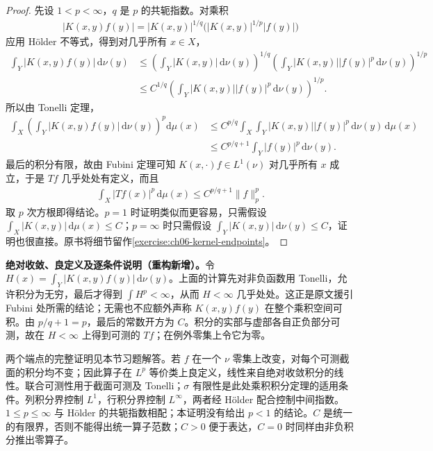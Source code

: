 \documentclass[../../main.tex]{subfiles}
\begin{document}
\begin{proof}
先设 $1<p<\infty$，$q$ 是 $p$ 的共轭指数。对乘积
\begin{align*}
|K(x,y)f(y)|=|K(x,y)|^{1/q}\bigl(|K(x,y)|^{1/p}|f(y)|\bigr)
\end{align*}
应用 Hölder 不等式，得到对几乎所有 $x\in X$，
\begin{align*}
\int_Y|K(x,y)f(y)|\,\mathrm d\nu(y)
&\leqslant\left(\int_Y|K(x,y)|\,\mathrm d\nu(y)\right)^{1/q}
\left(\int_Y|K(x,y)||f(y)|^p\,\mathrm d\nu(y)\right)^{1/p}\\
&\leqslant C^{1/q}\left(\int_Y|K(x,y)||f(y)|^p\,\mathrm d\nu(y)\right)^{1/p}.
\end{align*}
所以由 Tonelli 定理，
\begin{align*}
\int_X\left(\int_Y|K(x,y)f(y)|\,\mathrm d\nu(y)\right)^p\mathrm d\mu(x)
&\leqslant C^{p/q}\int_X\int_Y|K(x,y)||f(y)|^p\,\mathrm d\nu(y)\,\mathrm d\mu(x)\\
&\leqslant C^{p/q+1}\int_Y|f(y)|^p\,\mathrm d\nu(y).
\end{align*}
最后的积分有限，故由 Fubini 定理可知 $K(x,\cdot)f\in L^1(\nu)$ 对几乎所有 $x$ 成立，于是 $Tf$ 几乎处处有定义，而且
\begin{align*}
\int_X|Tf(x)|^p\,\mathrm d\mu(x)\leqslant C^{p/q+1}\|f\|_p^p.
\end{align*}
取 $p$ 次方根即得结论。$p=1$ 时证明类似而更容易，只需假设 $\int_X|K(x,y)|\,\mathrm d\mu(x)\leqslant C$；$p=\infty$ 时只需假设 $\int_Y|K(x,y)|\,\mathrm d\nu(y)\leqslant C$，证明也很直接。原书将细节留作\cref{exercise:ch06-kernel-endpoints}。
\end{proof}
\begin{remark}
\textbf{绝对收敛、良定义及逐条件说明（重构新增）。}令 $H(x)=\int_Y|K(x,y)f(y)|\,\mathrm d\nu(y)$。上面的计算先对非负函数用 Tonelli，允许积分为无穷，最后才得到 $\int H^p<\infty$，从而 $H<\infty$ 几乎处处。这正是原文援引 Fubini 处所需的结论；无需也不应额外声称 $K(x,y)f(y)$ 在整个乘积空间可积。由 $p/q+1=p$，最后的常数开方为 $C$。积分的实部与虚部各自正负部分可测，故在 $H<\infty$ 上得到可测的 $Tf$；在例外零集上令它为零。

两个端点的完整证明见本节习题解答。若 $f$ 在一个 $\nu$ 零集上改变，对每个可测截面的积分均不变；因此算子在 $L^p$ 等价类上良定义，线性来自绝对收敛积分的线性。联合可测性用于截面可测及 Tonelli；$\sigma$ 有限性是此处乘积积分定理的适用条件。列积分界控制 $L^1$，行积分界控制 $L^\infty$，两者经 Hölder 配合控制中间指数。$1\leqslant p\leqslant\infty$ 与 Hölder 的共轭指数相配；本证明没有给出 $p<1$ 的结论。$C$ 是统一的有限界，否则不能得出统一算子范数；$C>0$ 便于表达，$C=0$ 时同样由非负积分推出零算子。
\end{remark}
\end{document}
